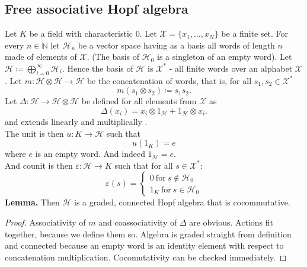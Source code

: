 \documentclass[a4paper, 12pt]{article}
\begin{document}
\subsection{Free associative Hopf algebra}
Let $K$ be a field with characteristic 0.
Let $\mathcal{X} = \{x_1, \dots, x_N\}$ be a finite set. For every $n \in \mathbb{N}$ let
$\mathcal{H}_n$ be a vector space having as a basis all words of length $n$ made of elements
of $\mathcal{X}$. (The basis of $\mathcal{H}_0$ is a singleton of an empty word).
Let $\mathcal{H} \coloneqq \displaystyle\bigoplus^{\infty}_{i = 0} \mathcal{H}_i$. Hence
the basis of $\mathcal{H}$ is $\mathcal{X}^*$ - all finite words over an alphabet $\mathcal{X}$.
Let $m : \mathcal{H} \otimes \mathcal{H} \to \mathcal{H}$ be the concatenation of words,
that is, for all $s_1, s_2 \in \mathcal{X}^*$
\begin{equation*}
m(s_1 \otimes s_2) \coloneqq s_1s_2.
\end{equation*}
Let $\Delta : \mathcal{H} \to \mathcal{H} \otimes \mathcal{H}$ be defined for all elements from
$\mathcal{X}$ as
\begin{equation*}
\Delta(x_i) = x_i \otimes 1_\mathcal{H} + 1_\mathcal{H} \otimes x_i.
\end{equation*}
and extends linearly and multiplically .\\
The unit is then $u : K \to \mathcal{H}$ such that
\begin{equation*}
u(1_K) = e
\end{equation*}
where $e$ is an empty word. And indeed $1_\mathcal{H} = e$. \\
And counit is then $\varepsilon : \mathcal{H} \to K$ such that for all $s \in \mathcal{X}^*$: \\
\begin{equation*}
\varepsilon(s) = \begin{cases}
0 \mathrm{\ for\ } s \notin \mathcal{H}_0 \\
1_K \mathrm{\ for\ } s \in \mathcal{H}_0
\end{cases}
\end{equation*}
\textbf{Lemma. } Then $\mathcal{H}$ is a graded, connected Hopf algebra that is cocommutative.
\begin{proof}
Associativity of $m$ and coassociativity of $\Delta$ are obvious. Actions fit together,
because we define them so. Algebra is graded straight from definition and connected because an empty word
is an identity element with respect to concatenation multiplication. Cocomutativity can be checked immediately.
\end{proof}
\end{document}
